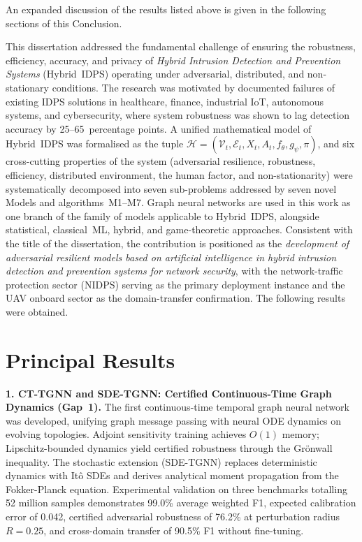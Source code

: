 \begin{enumerate}[leftmargin=2em, itemsep=0.3em]
\end{enumerate}

\noindent An expanded discussion of the results listed above is
given in the following sections of this Conclusion.

\bigskip

This dissertation addressed the fundamental challenge of ensuring
the robustness, efficiency, accuracy, and privacy of \emph{Hybrid
Intrusion Detection and Prevention Systems} (Hybrid~IDPS)
operating under adversarial, distributed, and non-stationary
conditions. The research was motivated by documented failures of
existing IDPS solutions in healthcare, finance, industrial IoT,
autonomous systems, and cybersecurity, where system robustness was
shown to lag detection accuracy by 25--65~percentage points. A
unified mathematical model of Hybrid~IDPS was formalised as the
tuple $\mathcal{H} = (\mathcal{V}_t, \mathcal{E}_t, X_t, A_t,
f_\theta, g_\psi, \pi)$, and six cross-cutting properties of the
system (adversarial resilience, robustness, efficiency, distributed
environment, the human factor, and non-stationarity) were
systematically decomposed into seven sub-problems addressed by seven
novel Models and algorithms~M1--M7. Graph neural networks are used
in this work as one branch of the family of models applicable to
Hybrid~IDPS, alongside statistical, classical~ML, hybrid, and
game-theoretic approaches. Consistent with the title of the
dissertation, the contribution is positioned as the
\emph{development of adversarial resilient models based on
artificial intelligence in hybrid intrusion detection and
prevention systems for network security}, with the
network-traffic protection sector (NIDPS) serving as the primary
deployment instance and the UAV onboard sector as the
domain-transfer confirmation. The following results were obtained.

\section*{Principal Results}

\noindent\textbf{1. CT-TGNN and SDE-TGNN: Certified Continuous-Time Graph Dynamics (Gap~1).}
The first continuous-time temporal graph neural network was developed, unifying graph message passing with neural ODE dynamics on evolving topologies. Adjoint sensitivity training achieves $O(1)$ memory; Lipschitz-bounded dynamics yield certified robustness through the Gr\"{o}nwall inequality. The stochastic extension (SDE-TGNN) replaces deterministic dynamics with It\^{o} SDEs and derives analytical moment propagation from the Fokker-Planck equation. Experimental validation on three benchmarks totalling 52 million samples demonstrates 99.0\% average weighted F1, expected calibration error of 0.042, certified adversarial robustness of 76.2\% at perturbation radius $R=0.25$, and cross-domain transfer of 90.5\% F1 without fine-tuning.

